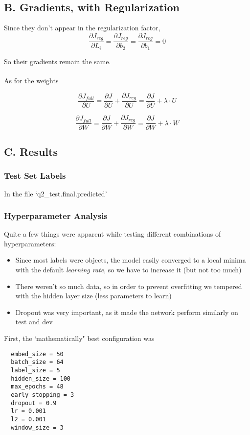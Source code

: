 \documentclass{article}
\begin{document}
\subsection*{B. Gradients, with Regularization}
Since they don't appear in the regularization factor,
$$
	\frac {\partial J_{reg}}{\partial L_i} = \frac {\partial J_{reg}}{\partial b_2}  = \frac {\partial J_{reg}}{\partial b_1}  = 0
$$

So their gradients remain the same. \\~\\
As for the weights

$$
	\frac {\partial J_{full}}{\partial U} = \frac {\partial J}{\partial U} + \frac {\partial J_{reg}}{\partial U} = \frac {\partial J}{\partial U} +  \lambda \cdot U
$$

$$
	\frac {\partial J_{full}}{\partial W} = \frac {\partial J}{\partial W} + \frac {\partial J_{reg}}{\partial W} = \frac {\partial J}{\partial W} +  \lambda \cdot W
$$

\subsection*{C. Results}
\subsubsection*{Test Set Labels}
In the file `q2\_test.final.predicted'

\subsubsection*{Hyperparameter Analysis}
Quite a few things were apparent while testing different combinations of hyperparameters:
\begin{itemize}
\item Since most labels were objects, the model easily converged to a local minima with the default \emph{learning rate}, so we have to increase it (but not too much)
\item There weren't so much data, so in order to prevent overfitting we tempered with the hidden layer size (less parameters to learn)
\item Dropout was very important, as it made the network perform similarly on test and dev
\end{itemize}

First, the `mathematically" best configuration was
\begin{lstlisting}
  embed_size = 50
  batch_size = 64
  label_size = 5
  hidden_size = 100
  max_epochs = 48
  early_stopping = 3
  dropout = 0.9
  lr = 0.001
  l2 = 0.001
  window_size = 3
\end{lstlisting}
\end{document}
